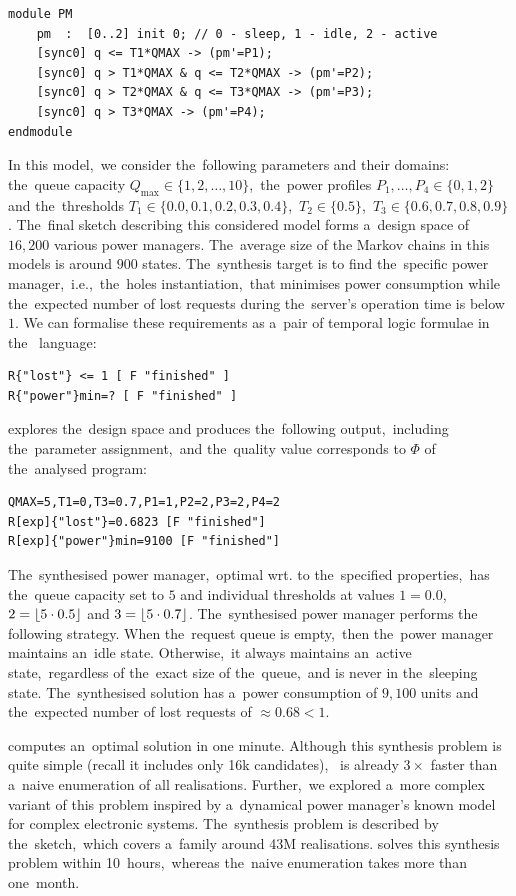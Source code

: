 \begin{verbatim}
module PM
    pm  :  [0..2] init 0; // 0 - sleep, 1 - idle, 2 - active
    [sync0] q <= T1*QMAX -> (pm'=P1);
    [sync0] q > T1*QMAX & q <= T2*QMAX -> (pm'=P2);
    [sync0] q > T2*QMAX & q <= T3*QMAX -> (pm'=P3);
    [sync0] q > T3*QMAX -> (pm'=P4);
endmodule
\end{verbatim}

In this model,~we consider the~following parameters and their domains: the~queue capacity $Q_{\max} \in \{1,2,\dots,10\}$,~the~power profiles $P_1,\dots,P_4 \in \{0,1,2\}$ and the~thresholds $T_1 \in \{0.0,0.1,0.2,0.3,0.4\}$,~$T_2 \in \{0.5\}$,~$T_3 \in \{0.6,0.7,0.8,0.9\}$.
The~final sketch describing this considered model forms a~design space of $16,200$ various power managers.
The~average size of the Markov chains in this models is around $900$ states.
The~synthesis target is to find the~specific power manager,~i.e.,~the~holes instantiation,~that minimises power consumption while the~expected number of lost requests during the~server's operation time is below $1$.
We can formalise these requirements as a~pair of temporal logic formulae in the~\prism{} language:
\begin{verbatim}
R{"lost"} <= 1 [ F "finished" ]  
R{"power"}min=? [ F "finished" ]
\end{verbatim}

\toolname{} explores the~design space and produces the~following output,~including the~parameter assignment,~and the~quality value corresponds to $\Phi$ of the~analysed program:
\begin{verbatim}
QMAX=5,T1=0,T3=0.7,P1=1,P2=2,P3=2,P4=2
R[exp]{"lost"}=0.6823 [F "finished"]
R[exp]{"power"}min=9100 [F "finished"]
\end{verbatim}
The~synthesised power manager,~optimal wrt. to the~specified properties,~has the~queue capacity set to $5$ and individual thresholds at values  $1 = 0.0$, $2 = \lfloor  5\cdot 0.5 \rfloor$ and $3 = \lfloor  5\cdot 0.7 \rfloor$.
The~synthesised power manager performs the following strategy.
When the~request queue is empty,~then the~power manager maintains an~idle state.
Otherwise,~it always maintains an~active state,~regardless of the~exact size of the~queue,~and is never in the~sleeping state.
The~synthesised solution has a~power consumption of $9,100$ units and the~expected number of lost requests of $\approx 0.68 < 1$.

\toolname{} computes an~optimal solution in one minute. 
Although this synthesis problem is quite simple (recall it includes only 16k candidates),~\toolname{} is already $3 \times$ faster than a~naive enumeration of all realisations.
Further,~we explored a~more complex variant of this problem inspired by a~dynamical power manager's known model for complex electronic systems.
The~synthesis problem is described by the~sketch,~which covers a~family around 43M realisations.
\toolname{} solves this synthesis problem within 10~hours,~whereas the~naive enumeration takes more than one~month.

